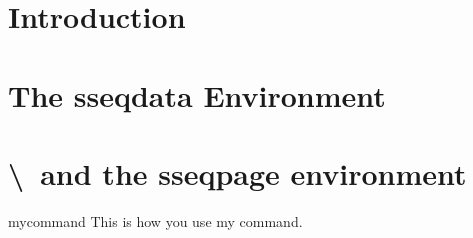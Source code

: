 \documentclass{ltxdoc}
\makeatletter
\def\sectionstring{\textbackslash\@xp\@gobble\string}
\makeatother
\begin{document}
\section{Introduction}

\section{The sseqdata Environment}


\section{\sectionstring\printpage\ and the sseqpage environment}

\begin{docCommand}{mycommand}{}
This is how you use my command.
\end{docCommand}
\end{document}
